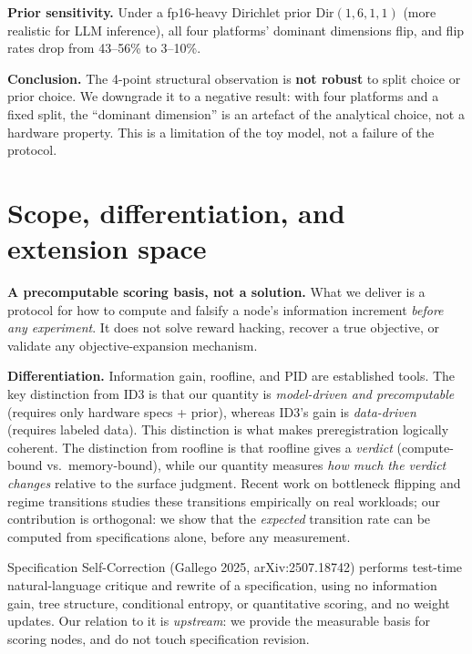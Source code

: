 \documentclass[10pt]{article}
\begin{document}
\textbf{Prior sensitivity.} Under a fp16-heavy Dirichlet prior $\mathrm{Dir}(1,6,1,1)$ (more realistic for LLM inference), all four platforms' dominant dimensions flip, and flip rates drop from 43--56\% to 3--10\%.

\textbf{Conclusion.} The 4-point structural observation is \textbf{not robust} to split choice or prior choice. We downgrade it to a negative result: with four platforms and a fixed split, the ``dominant dimension'' is an artefact of the analytical choice, not a hardware property. This is a limitation of the toy model, not a failure of the protocol.

\section{Scope, differentiation, and extension space}\label{scope-differentiation-and-extension-space}

\textbf{A precomputable scoring basis, not a solution.} What we deliver is a protocol for how to compute and falsify a node's information increment \emph{before any experiment}. It does not solve reward hacking, recover a true objective, or validate any objective-expansion mechanism.

\textbf{Differentiation.} Information gain, roofline, and PID are established tools. The key distinction from ID3 is that our quantity is \emph{model-driven and precomputable} (requires only hardware specs + prior), whereas ID3's gain is \emph{data-driven} (requires labeled data). This distinction is what makes preregistration logically coherent. The distinction from roofline \citep{roofline2009} is that roofline gives a \emph{verdict} (compute-bound vs.\ memory-bound), while our quantity measures \emph{how much the verdict changes} relative to the surface judgment. Recent work on bottleneck flipping and regime transitions \citep{memoryWallFlip2026,memoryGap2025,saScheduler2026} studies these transitions empirically on real workloads; our contribution is orthogonal: we show that the \emph{expected} transition rate can be computed from specifications alone, before any measurement.

Specification Self-Correction (Gallego 2025, arXiv:2507.18742) performs test-time natural-language critique and rewrite of a specification, using no information gain, tree structure, conditional entropy, or quantitative scoring, and no weight updates. Our relation to it is \emph{upstream}: we provide the measurable basis for scoring nodes, and do not touch specification revision.
\end{document}
